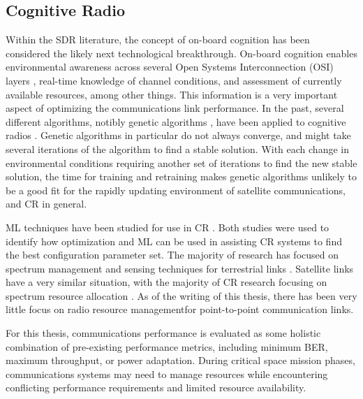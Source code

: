 \subsection{Cognitive Radio}
\par Within the SDR literature, the concept of on-board cognition has been considered the likely next technological breakthrough.  On-board cognition enables environmental awareness across several Open Systems Interconnection (OSI) layers \cite{paulo_cite_39}, real-time knowledge of channel conditions, and assessment of currently available resources, among other things. This information is a very important aspect of optimizing the communications link performance. In the past, several different algorithms, notibly genetic algorithms \cite{paulo_cite_40}, have been applied to cognitive radios \cite{paulo_cite_41}. Genetic algorithms in particular do not always converge, and might take several iterations of the algorithm to find a stable solution. With each change in environmental conditions requiring another set of iterations to find the new stable solution, the time for training and retraining makes genetic algorithms unlikely to be a good fit for the rapidly updating environment of satellite communications, and CR in general.
\par ML techniques have been studied for use in CR \cite{paulo_cite_42,paulo_cite_45}. Both studies were used to identify how optimization and ML can be used in assisting CR systems to find the best configuration parameter set. The majority of research has focused on spectrum management and sensing techniques for terrestrial links \cite{paulo_cite_45,paulo_cite_47}. Satellite links have a very similar situation, with the majority of CR research focusing on spectrum resource allocation \cite{paulo_cite_48,paulo_cite_50}. As of the writing of this thesis, there has been very little focus on radio resource managementfor point-to-point communication links.
\par For this thesis, communications performance is evaluated as some holistic combination of pre-existing performance metrics, including minimum BER, maximum throughput, or power adaptation. During critical space mission phases, communications systems may need to manage resources while encountering conflicting performance requirements and limited resource availability. 
